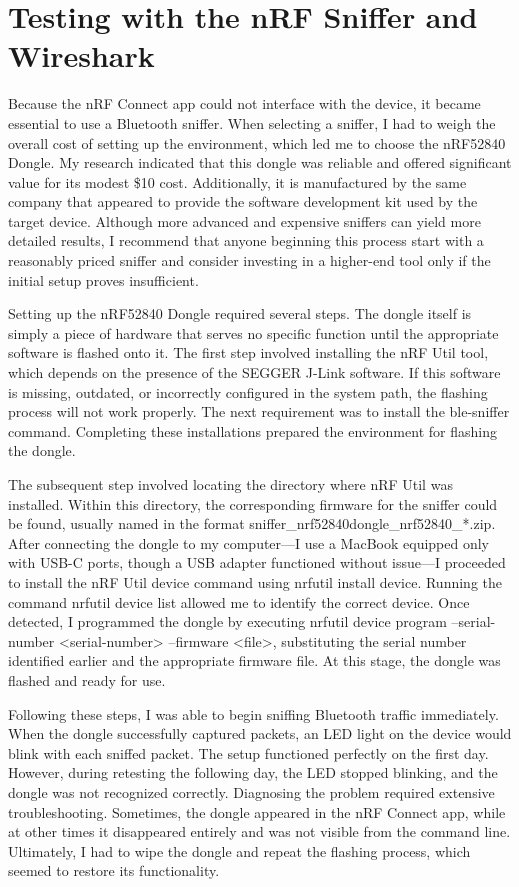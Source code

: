 \section{Testing with the nRF Sniffer and Wireshark}

Because the nRF Connect app could not interface with the device, it became essential to use a Bluetooth sniffer. When selecting a sniffer, I had to weigh the overall cost of setting up the environment, which led me to choose the nRF52840 Dongle. My research indicated that this dongle was reliable and offered significant value for its modest \$10 cost. Additionally, it is manufactured by the same company that appeared to provide the software development kit used by the target device. Although more advanced and expensive sniffers can yield more detailed results, I recommend that anyone beginning this process start with a reasonably priced sniffer and consider investing in a higher-end tool only if the initial setup proves insufficient.

Setting up the nRF52840 Dongle required several steps. The dongle itself is simply a piece of hardware that serves no specific function until the appropriate software is flashed onto it. The first step involved installing the nRF Util tool, which depends on the presence of the SEGGER J-Link software. If this software is missing, outdated, or incorrectly configured in the system path, the flashing process will not work properly. The next requirement was to install the ble-sniffer command. Completing these installations prepared the environment for flashing the dongle.

The subsequent step involved locating the directory where nRF Util was installed. Within this directory, the corresponding firmware for the sniffer could be found, usually named in the format sniffer\_nrf52840dongle\_nrf52840\_*.zip. After connecting the dongle to my computer—I use a MacBook equipped only with USB-C ports, though a USB adapter functioned without issue—I proceeded to install the nRF Util device command using nrfutil install device. Running the command nrfutil device list allowed me to identify the correct device. Once detected, I programmed the dongle by executing nrfutil device program --serial-number <serial-number> --firmware <file>, substituting the serial number identified earlier and the appropriate firmware file. At this stage, the dongle was flashed and ready for use.

Following these steps, I was able to begin sniffing Bluetooth traffic immediately. When the dongle successfully captured packets, an LED light on the device would blink with each sniffed packet. The setup functioned perfectly on the first day. However, during retesting the following day, the LED stopped blinking, and the dongle was not recognized correctly. Diagnosing the problem required extensive troubleshooting. Sometimes, the dongle appeared in the nRF Connect app, while at other times it disappeared entirely and was not visible from the command line. Ultimately, I had to wipe the dongle and repeat the flashing process, which seemed to restore its functionality.


